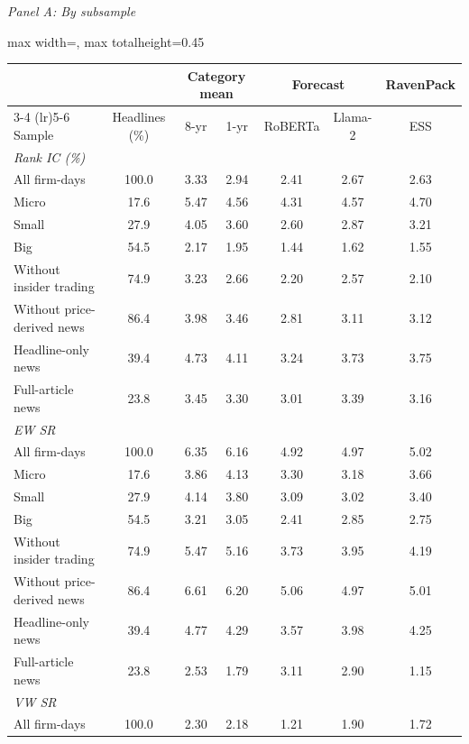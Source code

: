 \begin{table}[htbp]
{\footnotesize
\textit{Panel A: By subsample}\\[2pt]
\begin{adjustbox}{max width=\linewidth, max totalheight=0.45\textheight}
\begin{tabular}{lcccccc}
\toprule
\multicolumn{2}{c}{} & \multicolumn{2}{c}{Category mean} & \multicolumn{2}{c}{Forecast} & RavenPack \\
\cmidrule(lr){3-4} \cmidrule(lr){5-6}
Sample & Headlines (\%) & 8-yr & 1-yr & RoBERTa & Llama-2 & ESS \\
\midrule
\multicolumn{7}{l}{\textit{Rank IC (\%)}} \\
All firm-days & 100.0 & 3.33 & 2.94 & 2.41 & 2.67 & 2.63 \\
Micro & \phantom{0}17.6 & 5.47 & 4.56 & 4.31 & 4.57 & 4.70 \\
Small & \phantom{0}27.9 & 4.05 & 3.60 & 2.60 & 2.87 & 3.21 \\
Big & \phantom{0}54.5 & 2.17 & 1.95 & 1.44 & 1.62 & 1.55 \\
Without insider trading & \phantom{0}74.9 & 3.23 & 2.66 & 2.20 & 2.57 & 2.10 \\
Without price-derived news & \phantom{0}86.4 & 3.98 & 3.46 & 2.81 & 3.11 & 3.12 \\
Headline-only news & \phantom{0}39.4 & 4.73 & 4.11 & 3.24 & 3.73 & 3.75 \\
Full-article news & \phantom{0}23.8 & 3.45 & 3.30 & 3.01 & 3.39 & 3.16 \\
\midrule
\multicolumn{7}{l}{\textit{EW SR}} \\
All firm-days & 100.0 & 6.35 & 6.16 & 4.92 & 4.97 & 5.02 \\
Micro & \phantom{0}17.6 & 3.86 & 4.13 & 3.30 & 3.18 & 3.66 \\
Small & \phantom{0}27.9 & 4.14 & 3.80 & 3.09 & 3.02 & 3.40 \\
Big & \phantom{0}54.5 & 3.21 & 3.05 & 2.41 & 2.85 & 2.75 \\
Without insider trading & \phantom{0}74.9 & 5.47 & 5.16 & 3.73 & 3.95 & 4.19 \\
Without price-derived news & \phantom{0}86.4 & 6.61 & 6.20 & 5.06 & 4.97 & 5.01 \\
Headline-only news & \phantom{0}39.4 & 4.77 & 4.29 & 3.57 & 3.98 & 4.25 \\
Full-article news & \phantom{0}23.8 & 2.53 & 1.79 & 3.11 & 2.90 & 1.15 \\
\midrule
\multicolumn{7}{l}{\textit{VW SR}} \\
All firm-days & 100.0 & 2.30 & 2.18 & 1.21 & 1.90 & 1.72 \\

\end{tabular}
\end{adjustbox}}
\end{table}
